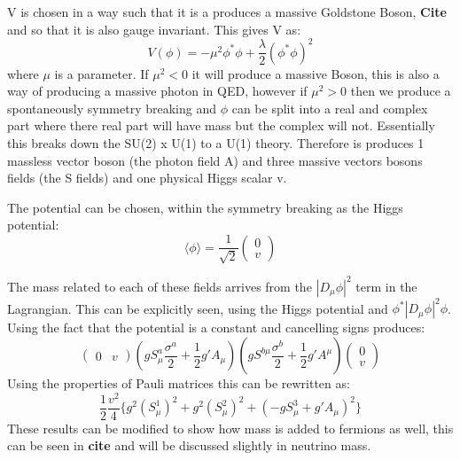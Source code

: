 V is chosen in a way such that it is a produces a massive Goldstone Boson, \textbf{Cite} and so that it is also gauge invariant. This gives V as:
\begin{equation}
V(\phi) = - \mu^2 \phi^{*}\phi + \frac{\lambda}{2}(\phi^{*}\phi)^2
\end{equation}
where $\mu$ is a parameter.
If $\mu^2 <0$ it will produce a massive Boson, this is also a way of producing a massive photon in QED, however if $\mu^2 >0$ then we produce a  spontaneously symmetry breaking and $\phi$ can be split into a real and complex part where there real part will have mass but the complex will not. Essentially this breaks down the SU(2) x U(1) to a U(1) theory. Therefore is produces 1 massless vector boson (the photon field A) and three massive vectors bosons fields (the S fields) and one physical Higgs scalar v. 

The potential can be chosen, within the symmetry breaking as the Higgs potential:
\begin{equation}
\langle \phi \rangle = \frac{1}{\sqrt{2}}
\begin{pmatrix}
    0\\
    v
\end{pmatrix}
\end{equation}

The mass related to each of these fields arrives from the $|D_\mu \phi |^2$ term in the Lagrangian. This can be explicitly seen, using the Higgs potential and $\phi^* |D_\mu \phi |^2 \phi$. Using the fact that the potential is a constant and cancelling signs produces:
\begin{equation}
\begin{pmatrix}
    0 & v
\end{pmatrix}
(
g S^a_\mu \frac{\sigma^a}{2} + \frac{1}{2}g' A_\mu
)
(
g S^{b\mu} \frac{\sigma^b}{2} + \frac{1}{2}g' A^\mu
)
\begin{pmatrix}
    0\\
    v
\end{pmatrix}
\end{equation}
Using the properties of Pauli matrices this can be rewritten as:
\begin{equation}
\frac{1}{2}\frac{v^2}{4}\lbrace g^2 (S_\mu^1)^2 + g^2 (S_\mu^2)^2 + (-gS^3_\mu+g' A_\mu)^2 \rbrace
\end{equation}
These results can be modified to show how mass is added to fermions as well, this can be seen in \textbf{cite} and will be discussed slightly in neutrino mass.

